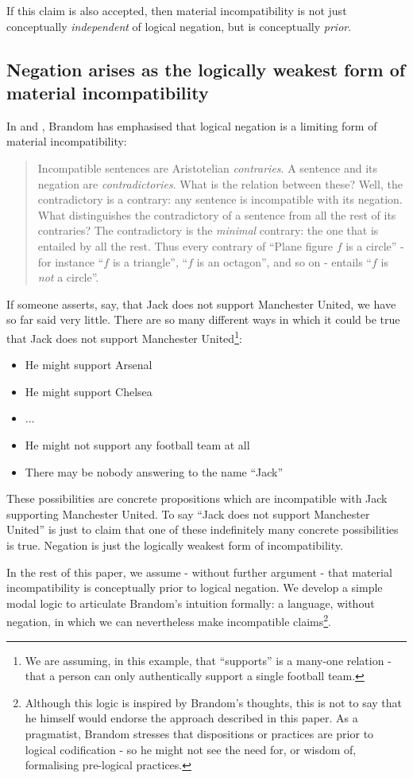 \NI If this claim is also accepted, then material incompatibility is
not just conceptually \emph{independent} of logical negation, but is
conceptually \emph{prior}.  

\subsection{Negation arises as the logically weakest form of material incompatibility}

In \cite{brandom2} and \cite{brandom}, Brandom has emphasised that
logical negation is a limiting form of material incompatibility:
\begin{quote}
Incompatible sentences are Aristotelian \emph{contraries}. A sentence
and its negation are \emph{contradictories}. What is the relation
between these? Well, the contradictory is a contrary: any sentence is
incompatible with its negation. What distinguishes the contradictory
of a sentence from all the rest of its contraries? The contradictory
is the \emph{minimal} contrary: the one that is entailed by all the
rest. Thus every contrary of ``Plane figure $f$ is a circle'' - for
instance ``$f$ is a triangle'', ``$f$ is an octagon'', and so on -
entails ``$f$ is \emph{not} a circle''.
\end{quote}

\NI If someone asserts, say, that Jack does not support Manchester United, we have so far said very little.  
There are so many different ways in which it could be true that Jack does not support Manchester United\footnote{We are assuming, in this example, that ``supports'' is a many-one relation - that a person can only authentically support a single football team.}:
\begin{itemize}
\item
He might support Arsenal
\item
He might support Chelsea
\item
...
\item
He might not support any football team at all
\item
There may be nobody answering to the name ``Jack''
\end{itemize}
These possibilities are concrete propositions which are incompatible with Jack supporting Manchester United.
To say ``Jack does not support Manchester United'' is just to claim that one of these indefinitely many concrete possibilities is true.
Negation is just the logically weakest form of incompatibility.

In the rest of this paper, we assume - without further argument - that material incompatibility is conceptually prior to logical negation.
We develop a simple
 modal logic to articulate Brandom's intuition formally: a language, without negation, in which we can nevertheless make incompatible claims\footnote{Although this logic is inspired by Brandom's thoughts, this is not to say that he himself would endorse the approach described in this paper. As a pragmatist, Brandom stresses that dispositions or practices are prior to logical codification - so he might not see the need for, or wisdom of, formalising pre-logical practices.}.

